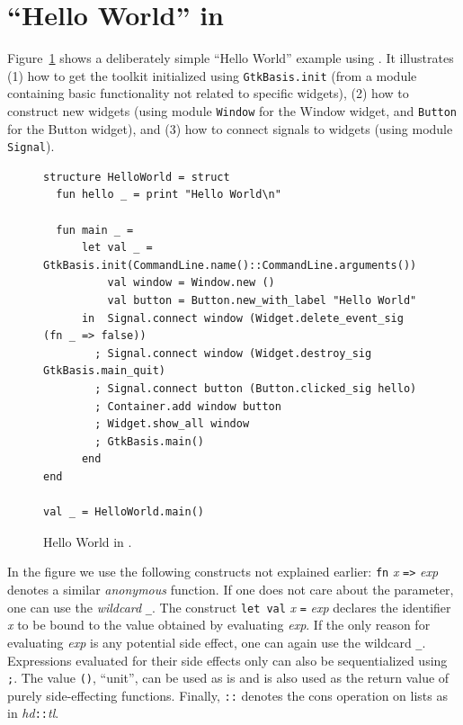 \documentclass[workingdraft]{usetex-v1}
\begin{document}
\section{``Hello World'' in \mgtk}
\label{sec:example}

Figure~\ref{fig:hello-world} shows a deliberately simple ``Hello World''
example using \mgtk. It illustrates (1) how to get the toolkit
initialized using \texttt{GtkBasis.init} (from a module containing
basic \gtk functionality not related to specific widgets), (2) how to
construct new widgets (using module \texttt{Window} for the Window
widget, and \texttt{Button} for the Button widget), and (3) how to
connect signals to widgets (using module \texttt{Signal}).
\begin{figure}[htp]
\begin{centering}
\begin{verbatim}
structure HelloWorld = struct
  fun hello _ = print "Hello World\n"

  fun main _ =
      let val _ = GtkBasis.init(CommandLine.name()::CommandLine.arguments())
          val window = Window.new ()
          val button = Button.new_with_label "Hello World"
      in  Signal.connect window (Widget.delete_event_sig (fn _ => false))
        ; Signal.connect window (Widget.destroy_sig GtkBasis.main_quit)
        ; Signal.connect button (Button.clicked_sig hello)
        ; Container.add window button
        ; Widget.show_all window
        ; GtkBasis.main() 
      end
end

val _ = HelloWorld.main()
\end{verbatim}
\caption{Hello World in \mgtk.\label{fig:hello-world}}
\end{centering}
\end{figure}

In the figure we use the following \sml constructs not explained
earlier: \texttt{fn}
\textit{x} \texttt{=>} \textit{exp} denotes a similar \emph{anonymous}
function. If one does not care about the parameter, one can use the
\emph{wildcard} \texttt{\_}. The construct \texttt{let}~\texttt{val}
\textit{x} \texttt{=} \textit{exp} declares the identifier \textit{x}
to be bound to the value obtained by evaluating \textit{exp}. If the
only reason for evaluating \textit{exp} is any potential side effect,
one can again use the wildcard \texttt{\_}. Expressions evaluated for
their side effects only can also be sequentialized using \texttt{;}.
The value \texttt{()}, ``unit'', can be used as is and is also used as
the return value of purely side-effecting functions.  Finally,
\texttt{::} denotes the cons operation on lists as in
\textit{hd}\texttt{::}\textit{tl}.
\end{document}
